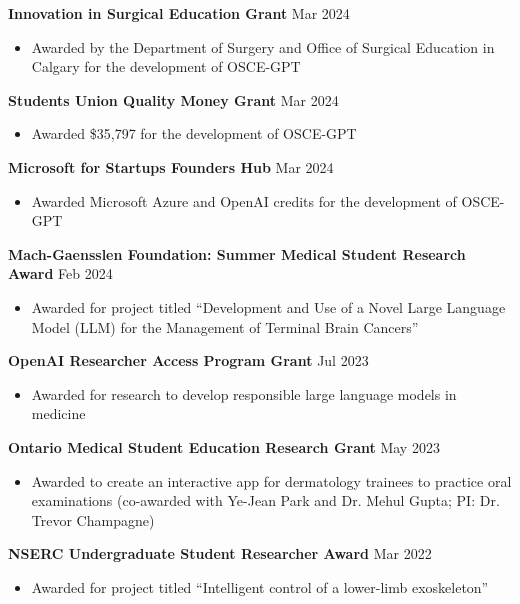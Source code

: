 \documentclass{article}
\begin{document}
\textbf{Innovation in Surgical Education Grant} \hfill Mar 2024
\begin{itemize}
    \item Awarded by the Department of Surgery and Office of Surgical Education in Calgary for the development of OSCE-GPT
\end{itemize} \vspace{1em}

\textbf{Students Union Quality Money Grant} \hfill Mar 2024
\begin{itemize}
    \item Awarded \$35,797 for the development of OSCE-GPT
\end{itemize} \vspace{1em}

\textbf{Microsoft for Startups Founders Hub} \hfill Mar 2024
\begin{itemize}
    \item Awarded Microsoft Azure and OpenAI credits for the development of OSCE-GPT
\end{itemize} \vspace{1em}

\textbf{Mach-Gaensslen Foundation: Summer Medical Student Research Award} \hfill Feb 2024
\begin{itemize}
    \item Awarded for project titled ``Development and Use of a Novel Large Language Model (LLM) for the Management of Terminal Brain Cancers''
\end{itemize} \vspace{1em}

\textbf{OpenAI Researcher Access Program Grant} \hfill Jul 2023
\begin{itemize}
    \item Awarded for research to develop responsible large language models in medicine
\end{itemize} \vspace{1em}

\textbf{Ontario Medical Student Education Research Grant} \hfill May 2023
\begin{itemize}
    \item Awarded to create an interactive app for dermatology trainees to practice oral examinations (co-awarded with Ye-Jean Park and Dr. Mehul Gupta; PI: Dr. Trevor Champagne)
\end{itemize} \vspace{1em}

\textbf{NSERC Undergraduate Student Researcher Award} \hfill Mar 2022
\begin{itemize}
    \item Awarded for project titled ``Intelligent control of a lower-limb exoskeleton''
\end{itemize} \vspace{1em}
\end{document}
